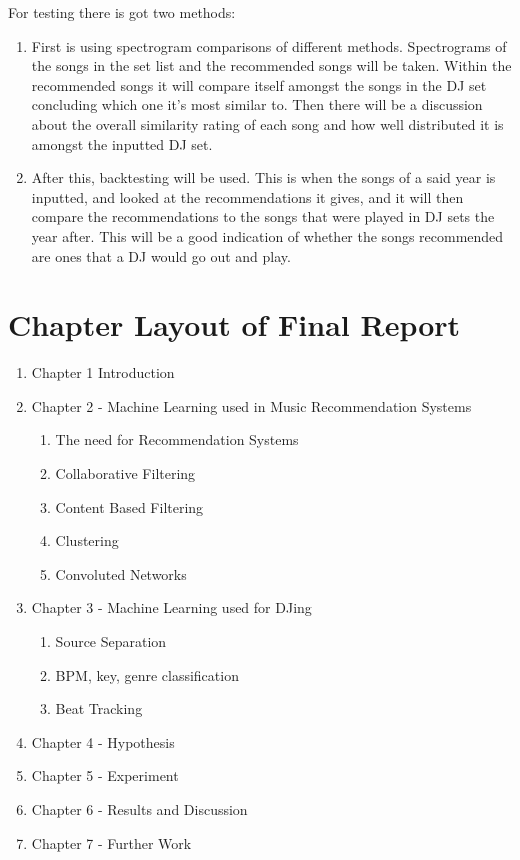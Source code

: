 \documentclass[]{article}
\begin{document}
\begin{flushleft}
	For testing there is got two methods: 
\end{flushleft}
\begin{enumerate}
	\item First is using spectrogram comparisons of different methods. Spectrograms of the songs in the set list and the recommended songs will be taken. Within the recommended songs it will compare itself amongst the songs in the DJ set concluding which one it’s most similar to. Then there will be a discussion about the overall similarity rating of each song and how well distributed it is amongst the inputted DJ set.
	\item After this, backtesting will be used. This is when the songs of a said year is inputted, and looked at the recommendations it gives, and it will then compare the recommendations to the songs that were played in DJ sets the year after. This will be a good indication of whether the songs recommended are ones that a DJ would go out and play.
\end{enumerate}

\section{Chapter Layout of Final Report}
\begin{enumerate}
	\item Chapter 1 Introduction
	\item Chapter 2 - Machine Learning used in Music Recommendation Systems
	\begin{enumerate}
		\item The need for Recommendation Systems
		\item Collaborative Filtering
		\item Content Based Filtering
		\item Clustering
		\item Convoluted Networks
	\end{enumerate}
	\item Chapter 3 - Machine Learning used for DJing
	\begin{enumerate}
		\item Source Separation
		\item BPM, key, genre classification
		\item Beat Tracking 
	\end{enumerate}
	\item Chapter 4 - Hypothesis
	\item Chapter 5 - Experiment
	\item Chapter 6 - Results and Discussion
	\item Chapter 7 - Further Work
	
\end{enumerate}
\end{document}
